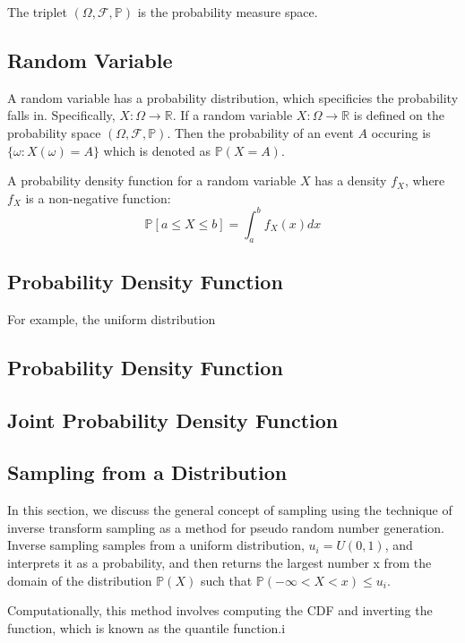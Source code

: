 The triplet $(\Omega,\mathcal{F},\mathbb{P})$ is the probability measure space.

\subsection{Random Variable}
A random variable has a probability distribution, which specificies the probability falls in.  Specifically, $X:\Omega\rightarrow\mathbb{R}$.  If a random variable $X:\Omega \rightarrow \mathbb{R}$ is defined on the probability space $(\Omega,\mathcal{F},\mathbb{P})$.  Then the probability of an event $A$ occuring is $\{\omega:X(\omega)=A\}$ which is denoted as $\mathbb{P}(X=A)$.

A probability density function for a random variable $X$ has a density $f_X$, where $f_X$ is a non-negative function:
\begin{equation}
  \mathbb{P}[a \leq X \leq b]=\int_{a}^{b}f_{X}(x)dx
\end{equation}

\subsection{Probability Density Function}

For example, the uniform distribution

\subsection{Probability Density Function}

\subsection{Joint Probability Density Function}

\subsection{Sampling from a Distribution}

In this section, we discuss the general concept of sampling using the technique of inverse transform sampling as a method for pseudo random number generation.  Inverse sampling samples from a uniform distribution, $u_i=U(0,1)$, and interprets it as a probability, and then returns the largest number x from the domain of the distribution $\mathbb{P}(X)$ such that $\mathbb{P}(-\infty<X<x) \leq u_i$.

Computationally, this method involves computing the CDF and inverting the function, which is known as the quantile function.i

